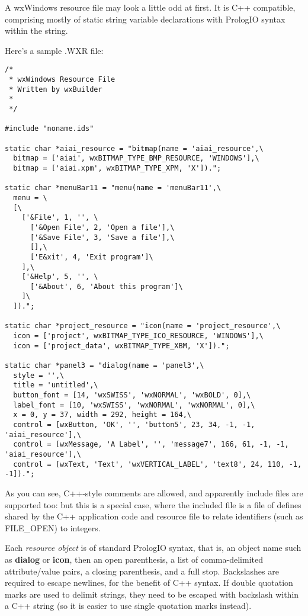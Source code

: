 A wxWindows resource file may look a little odd at first. It is C++
compatible, comprising mostly of static string variable declarations with
PrologIO syntax within the string.

Here's a sample .WXR file:

\begin{verbatim}
/*
 * wxWindows Resource File
 * Written by wxBuilder
 *
 */

#include "noname.ids"

static char *aiai_resource = "bitmap(name = 'aiai_resource',\
  bitmap = ['aiai', wxBITMAP_TYPE_BMP_RESOURCE, 'WINDOWS'],\
  bitmap = ['aiai.xpm', wxBITMAP_TYPE_XPM, 'X']).";

static char *menuBar11 = "menu(name = 'menuBar11',\
  menu = \
  [\
    ['&File', 1, '', \
      ['&Open File', 2, 'Open a file'],\
      ['&Save File', 3, 'Save a file'],\
      [],\
      ['E&xit', 4, 'Exit program']\
    ],\
    ['&Help', 5, '', \
      ['&About', 6, 'About this program']\
    ]\
  ]).";

static char *project_resource = "icon(name = 'project_resource',\
  icon = ['project', wxBITMAP_TYPE_ICO_RESOURCE, 'WINDOWS'],\
  icon = ['project_data', wxBITMAP_TYPE_XBM, 'X']).";

static char *panel3 = "dialog(name = 'panel3',\
  style = '',\
  title = 'untitled',\
  button_font = [14, 'wxSWISS', 'wxNORMAL', 'wxBOLD', 0],\
  label_font = [10, 'wxSWISS', 'wxNORMAL', 'wxNORMAL', 0],\
  x = 0, y = 37, width = 292, height = 164,\
  control = [wxButton, 'OK', '', 'button5', 23, 34, -1, -1, 'aiai_resource'],\
  control = [wxMessage, 'A Label', '', 'message7', 166, 61, -1, -1, 'aiai_resource'],\
  control = [wxText, 'Text', 'wxVERTICAL_LABEL', 'text8', 24, 110, -1, -1]).";
\end{verbatim}

As you can see, C++-style comments are allowed, and apparently include files
are supported too: but this is a special case, where the included file
is a file of defines shared by the C++ application code and resource file
to relate identifiers (such as FILE\_OPEN) to integers.

Each {\it resource object} is of standard PrologIO syntax, that is,
an object name such as {\bf dialog} or {\bf icon}, then an open
parenthesis, a list of comma-delimited attribute/value pairs, a closing
parenthesis, and a full stop. Backslashes are required to escape newlines,
for the benefit of C++ syntax. If double quotation marks are used to
delimit strings, they need to be escaped with backslash within a C++ string
(so it is easier to use single quotation marks instead).

